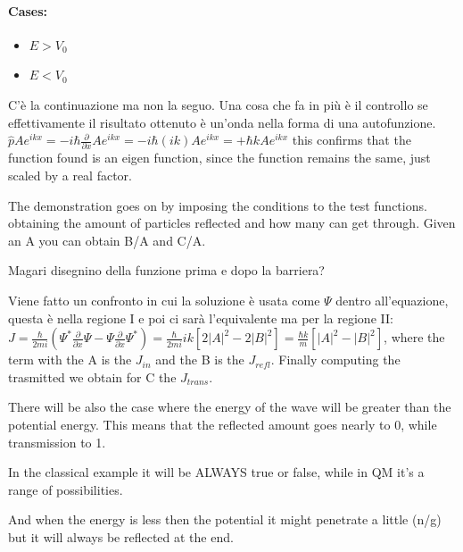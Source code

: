 \paragraph{Cases:}

\begin{itemize}
    \item $E > V_0$
    \item $E < V_0$
\end{itemize}

C'è la continuazione ma non la seguo. Una cosa che fa in più è il controllo se effettivamente il risultato ottenuto è un'onda nella forma di una autofunzione. $\hat{p}Ae^{ikx} = -i\hbar \frac{\partial}{\partial x} A e^{ikx} = -i\hbar (ik) Ae^{ikx} = + \hbar kAe^{ikx}$ this confirms that the function found is an eigen function, since the function remains the same, just scaled by a real factor.

The demonstration goes on by imposing the conditions to the test functions. obtaining the amount of particles reflected and how many can get through. Given an A you can obtain B/A and C/A.

\vspace{10pt}

Magari disegnino della funzione prima e dopo la barriera?

\vspace{10pt}

Viene fatto un confronto in cui la soluzione è usata come $\Psi$ dentro all'equazione, questa è nella regione I e poi ci sarà l'equivalente ma per la regione II: $J = \frac{\hbar}{2mi}(\Psi^* \frac{\partial}{\partial x}\Psi - \Psi \frac{\partial}{\partial x}\Psi^*) = \frac{\hbar}{2mi}ik\left[ 2|A|^2 - 2|B|^2 \right] = \frac{\hbar k}{m} \left[ |A|^2 - |B|^2 \right]$, where the term with the A is the $J_{in}$ and the B is the $J_{refl}$. Finally computing the trasmitted we obtain for C the $J_{trans}$.

There will be also the case where the energy of the wave will be greater than the potential energy. This means that the reflected amount goes nearly to 0, while transmission to 1.

In the classical example it will be ALWAYS true or false, while in QM it's a range of possibilities.

And when the energy is less then the potential it might penetrate a little (n/g) but it will always be reflected at the end.
